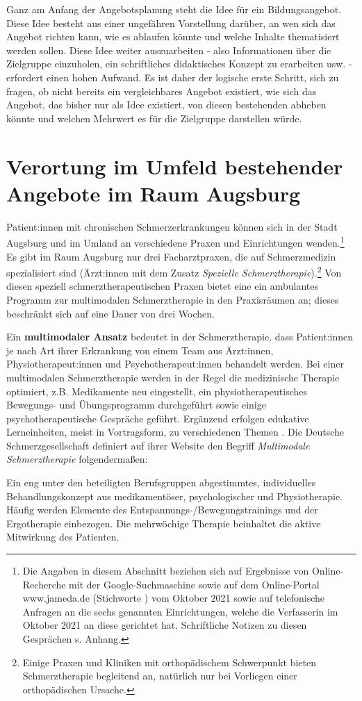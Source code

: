 \documentclass[
  twoside,
  parskip=half-,
]{scrreprt}
\begin{document}
Ganz am Anfang der Angebotsplanung steht die Idee für ein Bildungsangebot. Diese Idee besteht aus einer ungefähren Vorstellung darüber, an wen sich das Angebot richten kann, wie es ablaufen könnte und welche Inhalte thematisiert werden sollen. Diese Idee weiter auszuarbeiten - also Informationen über die Zielgruppe einzuholen, ein schriftliches didaktisches Konzept zu erarbeiten usw. - erfordert einen hohen Aufwand. Es ist daher der logische erste Schritt, sich zu fragen, ob nicht bereits ein vergleichbares Angebot existiert, wie sich das Angebot, das bisher nur als Idee existiert, von diesen bestehenden abheben könnte und welchen Mehrwert es für die Zielgruppe darstellen würde.

\section{Verortung im Umfeld bestehender Angebote im Raum Augsburg}

Patient:innen mit chronischen Schmerzerkrankungen können sich in der Stadt Augsburg und im Umland an verschiedene Praxen und Einrichtungen wenden.\footnote{Die Angaben in diesem Abschnitt beziehen sich auf Ergebnisse von Online-Recherche mit der Google-Suchmaschine sowie auf dem Online-Portal www.jameda.de (Stichworte ) vom Oktober 2021 sowie auf telefonische Anfragen an die sechs genannten Einrichtungen, welche die Verfasserin im Oktober 2021 an diese gerichtet hat. Schriftliche Notizen zu diesen Gesprächen s. Anhang.} Es gibt im Raum Augsburg nur drei Facharztpraxen, die auf Schmerzmedizin spezialisiert sind (Ärzt:innen mit dem Zusatz \textit{Spezielle Schmerztherapie}).\footnote{Einige Praxen und Kliniken mit orthopädischem Schwerpunkt bieten Schmerztherapie begleitend an, natürlich nur bei Vorliegen einer orthopädischen Ursache.} Von diesen speziell schmerztherapeutischen Praxen bietet eine ein ambulantes Programm zur multimodalen Schmerztherapie in den Praxisräumen an; dieses beschränkt sich auf eine Dauer von drei Wochen.

Ein \textbf{multimodaler Ansatz} bedeutet in der Schmerztherapie, dass Patient:innen je nach Art ihrer Erkrankung von einem Team aus Ärzt:innen, Physiotherapeut:innen und Psychotherapeut:innen behandelt werden. Bei einer multimodalen Schmerztherapie werden in der Regel die medizinische Therapie optimiert, z.B. Medikamente neu eingestellt, ein physiotherapeutisches Bewegungs- und Übungsprogramm durchgeführt sowie einige psychotherapeutische Gespräche geführt. Ergänzend erfolgen edukative Lerneinheiten, meist in Vortragsform, zu verschiedenen Themen \autocite[vgl.][99]{nobisHerausforderung}. Die Deutsche Schmerzgesellschaft definiert auf ihrer Website den Begriff \textit{Multimodale Schmerztherapie} folgendermaßen: 
\begin{displayquote}
  Ein eng unter den beteiligten Berufsgruppen abgestimmtes, individuelles Behandlungskonzept aus medikamentöser, psychologischer und Physiotherapie. Häufig werden Elemente des Entspannungs-/Bewegungstrainings und der Ergotherapie einbezogen. Die mehrwöchige Therapie beinhaltet die aktive Mitwirkung des Patienten.
\end{displayquote}
\end{document}
